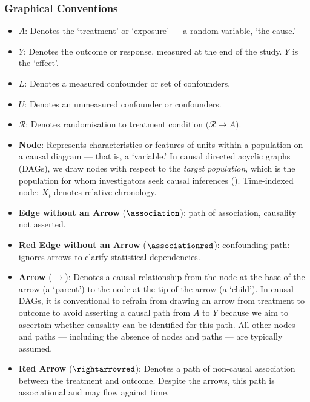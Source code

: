 \documentclass[
  single column]{article}
\begin{document}
\subsubsection{Graphical Conventions}\label{graphical-conventions}

\begin{itemize}
\item
  \textbf{\(A\)}: Denotes the `treatment' or `exposure' --- a random
  variable, `the cause.'
\item
  \textbf{\(Y\)}: Denotes the outcome or response, measured at the end
  of the study. \(Y\) is the `effect'.
\item
  \textbf{\(L\)}: Denotes a measured confounder or set of confounders.
\item
  \textbf{\(U\)}: Denotes an unmeasured confounder or confounders.
\item
  \(\mathbf{\mathcal{R}}\): Denotes randomisation to treatment condition
  \(\big(\mathcal{R} \rightarrow A\big)\).
\item
  \textbf{Node}: Represents characteristics or features of units within
  a population on a causal diagram --- that is, a `variable.' In causal
  directed acyclic graphs (DAGs), we draw nodes with respect to the
  \emph{target population}, which is the population for whom
  investigators seek causal inferences (). Time-indexed node: \(X_t\) denotes relative
  chronology.
\item
  \textbf{Edge without an Arrow} (\(\association\)): path of
  association, causality not asserted.
\item
  \textbf{Red Edge without an Arrow} (\(\associationred\)): confounding
  path: ignores arrows to clarify statistical dependencies.
\item
  \textbf{Arrow} (\(\rightarrow\)): Denotes a causal relationship from
  the node at the base of the arrow (a `parent') to the node at the tip
  of the arrow (a `child'). In causal DAGs, it is conventional to
  refrain from drawing an arrow from treatment to outcome to avoid
  asserting a causal path from \(A\) to \(Y\) because we aim to
  ascertain whether causality can be identified for this path. All other
  nodes and paths --- including the absence of nodes and paths --- are
  typically assumed.
\item
  \textbf{Red Arrow} (\(\rightarrowred\)): Denotes a path of non-causal
  association between the treatment and outcome. Despite the arrows,
  this path is associational and may flow against time.

\end{itemize}
\end{document}
